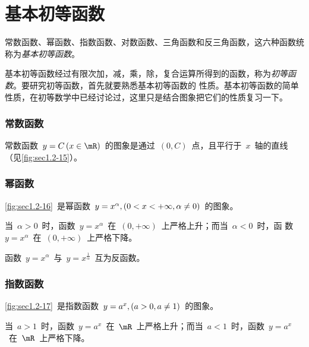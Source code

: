 \section{基本初等函数}

常数函数、幂函数、指数函数、对数函数、三角函数和反三角函数，这六种函数统称为\emph{基本初等函数}。

基本初等函数经过有限次加，减，乘，除，复合运算所得到的函数，称为\emph{初等函数}。要研究初等函数，首先就要熟悉基本初等函数的
性质。基本初等函数的简单性质，在初等数学中已经讨论过，这里只是结合图象把它们的性质复习一下。

\subsubsection{常数函数}

常数函数~$y=C\mcond{x\in\mR}$~的图象是通过~$(0,C)$~点，且平行于~$x$~轴的直线（见\ref{fig:sec1.2-15}）。

\subsubsection{幂函数}

\ref{fig:sec1.2-16}~是幂函数~$y=x^\alpha\mcond[,]{0<x<+\infty,\alpha\neq0}$~的图象。

当~$\alpha>0$~时，函数~$y=x^\alpha$~在~$(0,+\infty)$~上严格上升；而当~$\alpha<0$~时，函
数~$y=x^\alpha$~在~$(0,+\infty)$~上严格下降。

函数~$y=x^\alpha$~与~$y=x^{\frac1\alpha}$~互为反函数。

\begin{figure}
\begin{floatrow}
\end{floatrow}
\newFRline
\begin{floatrow}
\end{floatrow}
\end{figure}


\subsubsection{指数函数}

\ref{fig:sec1.2-17}~是指数函数~$y=a^x\mcond[,]{a>0,a\neq1}$~的图象。

当~$a>1$~时，函数~$y=a^x$~在~$\mR$~上严格上升；而当~$a<1$~时，函数~$y=a^x$~在~$\mR$~上严格下降。

